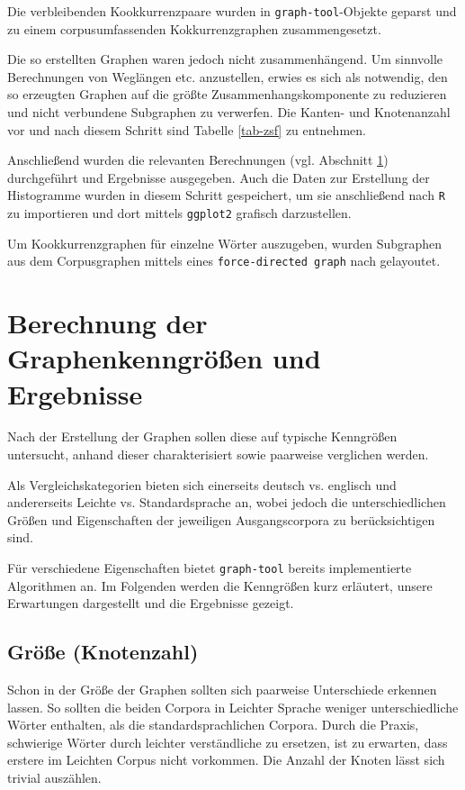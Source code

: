 \documentclass[11pt, a4paper]{article}
\begin{document}
Die verbleibenden Kookkurrenzpaare wurden in \texttt{graph-tool}-Objekte geparst
und zu einem corpusumfassenden Kokkurrenzgraphen zusammengesetzt.

Die so erstellten Graphen waren jedoch nicht zusammenhängend.
Um sinnvolle Berechnungen von Weglängen etc. anzustellen, erwies es sich als
notwendig, den so erzeugten Graphen auf die größte Zusammenhangskomponente zu
reduzieren und nicht verbundene Subgraphen zu verwerfen.
Die Kanten- und Knotenanzahl vor und nach diesem Schritt sind Tabelle
\ref{tab-zsf} zu entnehmen.

Anschließend wurden die relevanten Berechnungen (vgl. Abschnitt
\ref{sec:berechnung-ergebnisse}) durchgeführt und Ergebnisse ausgegeben.
Auch die Daten zur Erstellung der Histogramme wurden in diesem Schritt
gespeichert, um sie anschließend nach \texttt{R} zu importieren und dort mittels
\texttt{ggplot2} grafisch darzustellen.

Um Kookkurrenzgraphen für einzelne Wörter auszugeben, wurden Subgraphen aus dem
Corpusgraphen mittels eines \texttt{force-directed graph} nach
\cite{Hu2006} gelayoutet.


\section{Berechnung der Graphenkenngr\"o\ss{}en und Ergebnisse}
\label{sec:berechnung-ergebnisse}

Nach der Erstellung der Graphen sollen diese auf typische Kenngrößen untersucht,
anhand dieser charakterisiert sowie paarweise verglichen werden.

Als Vergleichskategorien bieten sich einerseits deutsch vs. englisch und andererseits Leichte vs.
Standardsprache an, wobei jedoch die unterschiedlichen Größen und Eigenschaften der
jeweiligen Ausgangscorpora zu berücksichtigen sind.

Für verschiedene Eigenschaften bietet \texttt{graph-tool} bereits implementierte
Algorithmen an. Im Folgenden werden die Kenngrößen kurz erläutert, unsere
Erwartungen dargestellt und die Ergebnisse gezeigt.


\subsection{Gr\"o\ss{}e (Knotenzahl)}
\label{groesse-knotenzahl}

Schon in der Größe der Graphen sollten sich paarweise Unterschiede erkennen
lassen. So sollten die beiden Corpora in Leichter Sprache weniger
unterschiedliche Wörter enthalten, als die standardsprachlichen Corpora.
Durch die Praxis, schwierige Wörter
durch leichter verständliche zu ersetzen, ist zu erwarten, dass erstere im
Leichten Corpus nicht vorkommen. Die Anzahl der Knoten lässt sich trivial
auszählen.
\end{document}
